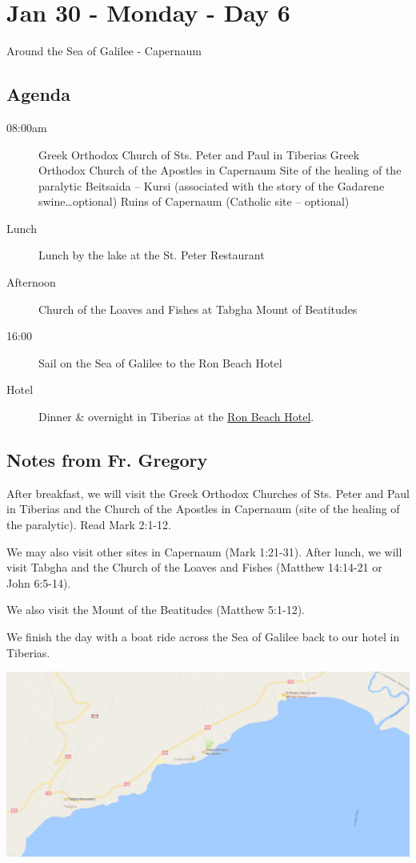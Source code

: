 \documentclass[letterpaper]{report}
\begin{document}
\clearpage
\section{Jan 30 - Monday - Day 6}
Around the Sea of Galilee - Capernaum

\subsection{Agenda}
\begin{description}
	\item[08:00am]  Greek Orthodox Church of Sts. Peter and Paul in Tiberias 
	  \subitem Greek Orthodox Church of the Apostles in Capernaum
	  \subitem Site of the healing of the paralytic
	  \subitem Beitsaida – Kursi
	      (associated with the story of the Gadarene swine…optional)
	  \subitem Ruins of Capernaum (Catholic site – optional) 
	\item[Lunch] Lunch by the lake at the St. Peter Restaurant
	\item[Afternoon] Church of the Loaves and Fishes at Tabgha Mount of 
	     Beatitudes
	\item[16:00] Sail on the Sea of Galilee to the Ron Beach Hotel
	\item[Hotel] Dinner \& overnight in Tiberias at the
	  \href{http://www.ronbeachhotel.com/}{Ron Beach Hotel}.
\end{description}

\subsection{Notes from Fr. Gregory}
After breakfast, we will visit the Greek Orthodox Churches of
Sts. Peter and Paul in Tiberias and the Church of the Apostles in Capernaum
(site of the healing of the paralytic).
Read Mark 2:1-12.

We may also visit other sites in Capernaum (Mark 1:21-31).
After lunch, we will visit Tabgha and the Church of the Loaves and Fishes
(Matthew 14:14-21 or John 6:5-14).

We also visit the Mount of the Beatitudes (Matthew 5:1-12).

We finish the day with a boat ride across the Sea of Galilee back to our hotel 
in Tiberias.

\includegraphics[width=\textwidth]{Capernaum}
\end{document}
